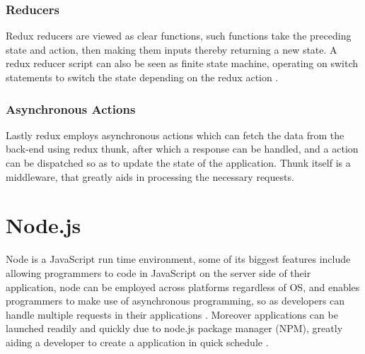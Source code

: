 \subsubsection{Reducers}
Redux reducers are viewed as clear functions, such functions take the preceding state and action, then making them inputs thereby returning a new state. A redux reducer script can also be seen as finite state machine, operating on switch statements to switch the state depending on the redux action \cite{holmstedt2019analyzing}.

\subsubsection{Asynchronous Actions}
Lastly redux employs asynchronous actions which can fetch the data from the back-end using redux thunk, after which a response can be handled, and a action can be dispatched so as to update the state of the application. Thunk itself is a middleware, that greatly aids in processing the necessary requests.

\section{Node.js}
Node is a JavaScript run time environment, some of its biggest features include allowing programmers to code in JavaScript on the server side of their application, node can be employed across platforms regardless of OS, and enables programmers to make use of asynchronous programming, so as developers can handle multiple requests in their applications \cite{Node.jsAboutPage}\cite{saundariya2021webapp}. Moreover applications can be launched readily and quickly due to node.js package manager (NPM), greatly aiding a developer to create a application in quick schedule \cite{rawat2020reactjs}. 

